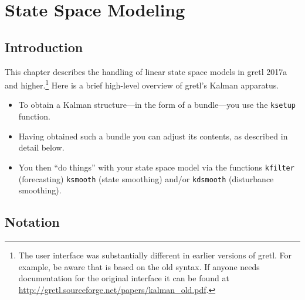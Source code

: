 \newcommand{\obsvec}{y}
\newcommand{\obsymat}{Z}
\newcommand{\obsx}{x}
\newcommand{\obsxmat}{B}
\newcommand{\obsdist}{u}
\newcommand{\obsvar}{R}

\newcommand{\statevec}{\alpha}
\newcommand{\statecvar}{P}
\newcommand{\statemat}{T}
\newcommand{\strdist}{w}
\newcommand{\statevar}{Q}
\newcommand{\gain}{K}
\newcommand{\statemu}{\mu}

\newcommand{\altstatevar}{H}
\newcommand{\altobsvar}{G}
\newcommand{\alldist}{\varepsilon}

\newcommand{\prederr}{v}
\newcommand{\predvar}{F}

\newcommand{\myvec}{\mbox{vec}}
\newcommand{\myvech}{\mbox{vech}}

\chapter{State Space Modeling}
\label{chap:kalman}

\section{Introduction}
\label{sec:amble}

This chapter describes the handling of linear state space models in
gretl 2017a and higher.\footnote{The user interface was substantially
  different in earlier versions of gretl.  For example, be aware that
  \cite{lucchetti11} is based on the old syntax. If anyone needs
  documentation for the original interface it can be found at
  \url{http://gretl.sourceforge.net/papers/kalman_old.pdf}.}  Here is
a brief high-level overview of gretl's Kalman apparatus.
%
\begin{itemize}
\item To obtain a Kalman structure---in the form of a bundle---you use
  the \texttt{ksetup} function.
\item Having obtained such a bundle you can adjust its contents, as
  described in detail below.
\item You then ``do things'' with your state space model via the
  functions \texttt{kfilter} (forecasting) \texttt{ksmooth} (state
  smoothing) and/or \texttt{kdsmooth} (disturbance smoothing).
\end{itemize}

\section{Notation}

